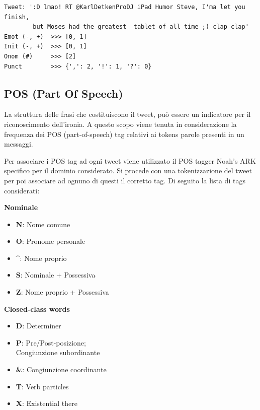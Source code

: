 \documentclass[oneside]{book}
\begin{document}
\begin{lstlisting}[caption={Esempio di tweet processato per estrarre le particelle pragmatiche.}]
Tweet: ':D lmao! RT @KarlDetkenProDJ iPad Humor Steve, I'ma let you finish,
        but Moses had the greatest  tablet of all time ;) clap clap'
Emot (-, +)  >>> [0, 1]
Init (-, +)  >>> [0, 1]
Onom (#)     >>> [2]
Punct        >>> {',': 2, '!': 1, '?': 0}
\end{lstlisting}


\subsection{POS (Part Of Speech)}
La struttura delle frasi che costituiscono il tweet, può essere un indicatore per il riconoscimento dell'ironia. A questo scopo viene tenuta in considerazione la frequenza dei POS (part-of-speech) tag relativi ai tokens parole presenti in un messaggi.

Per associare i POS tag ad ogni tweet viene utilizzato il POS tagger Noah's ARK \cite{ark} specifico per il dominio considerato. Si procede con una tokenizzazione del tweet per poi associare ad ognuno di questi il corretto tag. Di seguito la lista di tags considerati:\\


\begin{varwidth}[t]{\textwidth}
	\textbf{Nominale}
	\begin{itemize}
		\item \textbf{N}: Nome comune
		\item \textbf{O}: Pronome personale
		\item \textbf{\^}: Nome proprio
		\item \textbf{S}: Nominale + Possessiva
		\item \textbf{Z}: Nome proprio + Possessiva
	\end{itemize}
\end{varwidth}
\hspace{4em}
\begin{varwidth}[t]{\textwidth}
	\textbf{Closed-class words}
	\begin{itemize}
		\item \textbf{D}: Determiner
		\item \textbf{P}: Pre/Post-posizione;\\Congiunzione subordinante
		\item \textbf{\&}: Congiunzione coordinante
		\item \textbf{T}: Verb particles
		\item \textbf{X}: Existential there
	\end{itemize}
\end{varwidth}\\\\
\end{document}
